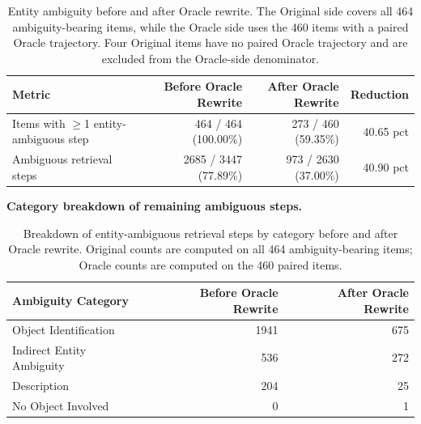 \begin{table}[t]
\centering
\small
\setlength{\tabcolsep}{6pt}
\begin{tabular}{lrrr}
\hline
Metric & Before Oracle Rewrite & After Oracle Rewrite & Reduction \\
\hline
Items with $\geq$1 entity-ambiguous step & 464 / 464 (100.00\%) & 273 / 460 (59.35\%) & 40.65 pct \\
Ambiguous retrieval steps & 2685 / 3447 (77.89\%) & 973 / 2630 (37.00\%) & 40.90 pct \\
\hline
\end{tabular}
\caption{Entity ambiguity before and after Oracle rewrite. The Original side covers all 464 ambiguity-bearing items, while the Oracle side uses the 460 items with a paired Oracle trajectory. Four Original items have no paired Oracle trajectory and are excluded from the Oracle-side denominator.}
\label{tab:oracle-rewrite-entity-ambiguity}
\end{table}

\noindent\textbf{Category breakdown of remaining ambiguous steps.}
\begin{table}[t]
\centering
\small
\setlength{\tabcolsep}{8pt}
\begin{tabular}{lrr}
\hline
Ambiguity Category & Before Oracle Rewrite & After Oracle Rewrite \\
\hline
Object Identification & 1941 & 675 \\
Indirect Entity Ambiguity & 536 & 272 \\
Description & 204 & 25 \\
No Object Involved & 0 & 1 \\
\hline
\end{tabular}
\caption{Breakdown of entity-ambiguous retrieval steps by category before and after Oracle rewrite. Original counts are computed on all 464 ambiguity-bearing items; Oracle counts are computed on the 460 paired items.}
\label{tab:oracle-rewrite-entity-ambiguity-breakdown}
\end{table}
